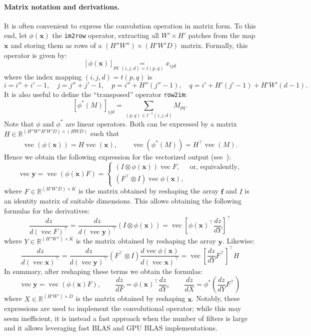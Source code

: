 \documentclass[12pt]{article}
\newcommand{\real}{\mathbb{R}}
\newcommand{\vv}{\operatorname{vec}}
\newcommand{\bx}{\mathbf{x}}
\newcommand{\by}{\mathbf{y}}
\newcommand{\bff}{\mathbf{f}}
\begin{document}
\paragraph{Matrix notation and derivations.} It is often convenient to express the convolution operation in matrix form. To this end, let $\phi(\bx)$ the {\tt im2row} operator, extracting all $W' \times H'$ patches from the map $\bx$ and storing them as rows of a $(H''W'') \times (H'W'D)$ matrix. Formally, this operator is given by:
\[
   [\phi(\bx)]_{pq} \underset{(i,j,d)=t(p,q)}{=} x_{ijd}
\]
where the index mapping $(i,j,d) = t(p,q)$ is
\[
 i = i''+i'-1, \quad
 j = j''+j'-1, \quad
 p = i'' + H'' (j''-1), \quad
 q = i' + H'(j'-1) + H'W' (d-1).
\]
It is also useful to define the ``transposed'' operator {\tt row2im}:
\[
   [\phi^*(M)]_{ijd}
   =
   \sum_{(p,q) \in t^{-1}(i,j,d)}
   M_{pq}.
\]
Note that $\phi$ and $\phi^*$ are linear operators. Both can be expressed by a matrix $H\in\real^{(H''W''H'W'D) \times(HWD)}$ such that
\[
  \vv(\phi(\bx)) = H \vv(\bx), \qquad 
  \vv(\phi^*(M)) = H^\top \vv(M).
\]
Hence we obtain the following expression for the vectorized output (see~\cite{kinghorn96integrals}):
\[
 \vv\by = 
 \vv\left(\phi(\bx) F\right)
 =
 \begin{cases}
 (I \otimes \phi(\bx)) \vv F, & \text{or, equivalently,} \\
 (F^\top \otimes I) \vv \phi(\bx),
 \end{cases}
\]
where $F\in\mathbb{R}^{(H'W'D)\times K}$ is the matrix obtained by reshaping the array $\bff$ and $I$ is an identity matrix of suitable dimensions. This allows obtaining the following formulas for the derivatives:
\[
\frac{dz}{d(\vv F)^\top}
=
\frac{dz}{d(\vv\by)^\top}
(I \otimes \phi(\bx))
= \vv\left[ 
\phi(\bx)^\top 
\frac{dz}{dY}
\right]^\top
\]
where $Y\in\real^{(H''W'')\times K}$ is the matrix obtained by reshaping the array $\by$. Likewise:
\[
\frac{dz}{d(\vv \bx)^\top}
=
\frac{dz}{d(\vv\by)^\top}
(F^\top \otimes I)
\frac{d\vv \phi(\bx)}{d(\vv \bx)^\top}
=
\vv\left[ 
\frac{dz}{dY}
F^\top
\right]^\top
H
\]
In summary, after reshaping these terms we obtain the formulas:
\[
\boxed{
\vv\by = 
 \vv\left(\phi(\bx) F\right),
\qquad
\frac{dz}{dF}
=
\phi(\bx)^\top\frac{d z}{d Y},
\qquad
\frac{d z}{d X}
=
\phi^*\left(
\frac{d z}{d Y}F^\top
\right)
}
\]
where $X\in\real^{(H'W')\times D}$ is the matrix obtained by reshaping $\bx$. Notably, these expressions are used to implement the convolutional operator; while this may seem inefficient, it is instead a fast approach when the number of filters is large and it allows leveraging fast BLAS and GPU BLAS implementations.
\end{document}
